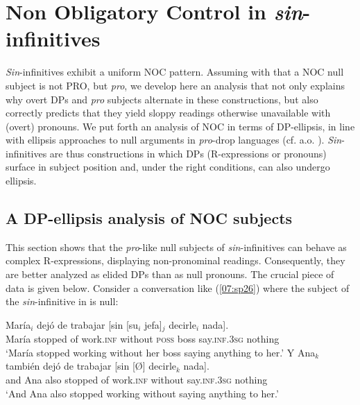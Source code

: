 \documentclass[output=paper,colorlinks,citecolor=brown,draft,draftmode]{langscibook}
\begin{document}
\section{Non Obligatory Control in \textit{sin}-infinitives}
\label{07:section3}
\textit{Sin}-infinitives exhibit a uniform NOC pattern. Assuming with \citet{hornstein99} that a NOC null subject is not PRO, but \textit{pro}, we develop here an analysis that not only explains why overt DPs and \textit{pro} subjects alternate in these constructions, but also correctly predicts that they yield sloppy readings otherwise unavailable with (overt) pronouns.
We put forth an analysis of NOC in terms of DP-ellipsis, in line with ellipsis approaches to null arguments in \textit{pro}-drop languages (cf. a.o. \citealt{oku98,saito07, duguine13, duguine14, takahashi14}). \textit{Sin}-infinitives are thus constructions in which DPs (R-expressions or pronouns) surface in subject position and, under the right conditions, can also undergo ellipsis.

\subsection{A DP-ellipsis analysis of NOC subjects}
\label{07:section3.1}
This section shows that the \textit{pro}-like null subjects of \textit{sin}-infinitives can behave as complex R-expressions, displaying non-pronominal readings.  Consequently, they are better analyzed as elided DPs than as null pronouns.
The crucial piece of data is given below. Consider a conversation like (\ref{07:sp26}) where the subject of the \textit{sin}-infinitive in  is null:

\begin{exe}
\ex\label{07:sp26}
\begin{xlista}
\ex
\gll\label{07:sp26a}María$_i$ dejó de trabajar [sin [su$_i$ jefa]$_j$ decirle$_i$ nada].\\
María stopped of work.\textsc{inf} without \textsc{poss} boss say.\textsc{inf}.\textsc{3sg} nothing\\
\glt ‘María stopped working without her boss saying anything to her.’
\ex
\gll\label{07:sp26b}\label{07:sp26B}Y Ana$_k$ también dejó de trabajar [sin [Ø] decirle$_k$ nada].\\
and Ana also stopped of work.\textsc{inf} without {} say.\textsc{inf}.\textsc{3sg} nothing\\
\glt ‘And Ana also stopped working without saying anything to her.’
\end{xlista}
\end{exe}
\end{document}
